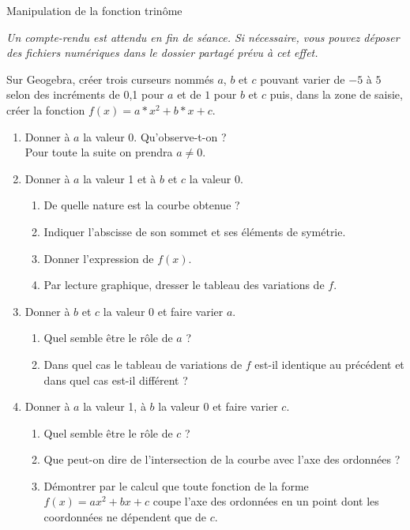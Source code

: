 \documentclass[11pt]{article}
\begin{document}
\begin{center}
  Manipulation de la fonction trinôme
\end{center}

\noindent\emph{Un compte-rendu est attendu en fin de séance. Si nécessaire, vous pouvez déposer des fichiers numériques dans le dossier partagé prévu à cet effet.}

\begin{exercice}
Sur Geogebra, créer trois curseurs nommés $a$, $b$ et $c$ pouvant varier de $-5$ à $5$ selon des incréments de 0,1 pour $a$ et de $1$ pour $b$ et $c$ puis, dans la zone de saisie, créer la fonction $f(x)=a*x^2+b*x+c$.
\begin{enumerate}
 \item Donner à $a$ la valeur 0. Qu'observe-t-on ?\\
       Pour toute la suite on prendra $a\neq0$.
 \item Donner à $a$ la valeur 1 et à $b$ et $c$ la valeur 0.
       \begin{enumerate}
        \item De quelle nature est la courbe obtenue ?
        \item Indiquer l'abscisse de son sommet et ses éléments de symétrie.
        \item Donner l'expression de $f(x)$.
        \item Par lecture graphique, dresser le tableau des variations de $f$.
       \end{enumerate}
 \item Donner à $b$ et $c$ la valeur 0 et faire varier $a$.
       \begin{enumerate}
        \item Quel semble être le \og rôle \fg{} de $a$ ?
	\item Dans quel cas le tableau de variations de $f$ est-il identique au précédent et dans quel cas est-il différent ?
       \end{enumerate}
 \item Donner à $a$ la valeur 1, à $b$ la valeur 0 et faire varier $c$.
       \begin{enumerate}
        \item Quel semble être le \og rôle \fg{} de $c$ ?
        \item Que peut-on dire de l'intersection de la courbe avec l'axe des ordonnées ?
        \item Démontrer par le calcul que toute fonction de la forme $f(x)=ax^2+bx+c$ coupe l'axe des ordonnées en un point dont les coordonnées ne dépendent que de $c$.

\end{enumerate}
\end{enumerate}
\end{exercice}
\end{document}
